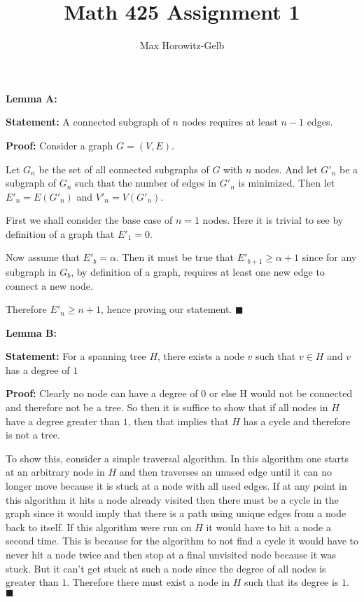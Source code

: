 \documentclass{article}
\title{Math 425 Assignment 1}
\author{Max Horowitz-Gelb}
\date{}
\newcommand*{\QEDA}{\hfill\ensuremath{\blacksquare}}%
\begin{document}
\maketitle
\section{}
\section{}
\textbf{Lemma A:}

\textbf{Statement:} A connected subgraph of $n$ nodes requires at least $n-1$ edges.

\textbf{Proof:} Consider a graph $G = (V,E)$. 

Let $G_n$ be the set of all connected subgraphs of $G$ with $n$ nodes. And let $G'_n$ be a subgraph of $G_n$ such that the number of edges in $G'_n$ is minimized. Then let $E'_n = E(G'_n)$ and $V'_n = V(G'_n)$.

First we shall consider the base case of $n = 1$ nodes. Here it is trivial to see by definition of a graph that $E'_1 = 0$. 

Now assume that $E'_b = \alpha$. Then it must be true that $E'_{b+1} \geq \alpha + 1$ since for any subgraph in $G_b$, by definition of a graph, requires at least one new edge to connect a new node.

Therefore $E'_n \geq n+1$, hence proving our statement. 
\QEDA

\textbf{Lemma B:}

\textbf{Statement:}
For a spanning tree $H$, there exists a node $v$ such that $v \in H$ and $v$ has a degree of $1$

\textbf{Proof:} Clearly no node can have a degree of $0$ or else H would not be connected and therefore not be a tree. So then it is suffice to show that if all nodes in $H$ have a degree greater than $1$, then that implies that $H$ has a cycle and therefore is not a tree. 

To show this, consider a simple traversal algorithm. In this algorithm one starts at an arbitrary node in $H$ and then traverses an unused edge until it can no longer move because it is stuck at a node with all used edges. If at any point in this algorithm it hits a node already visited then there must be a cycle in the graph since it would imply that there is a path using unique edges from a node back to itself. If this algorithm were run on $H$ it would have to hit a node a second time. This is because for the algorithm to not find a cycle it would have to never hit a node twice and then stop at a final unvisited node because it was stuck. But it can't get stuck at such a node since the degree of all nodes is greater than $1$. Therefore there must exist a node in $H$ such that its degree is $1$.
\QEDA
\end{document}
